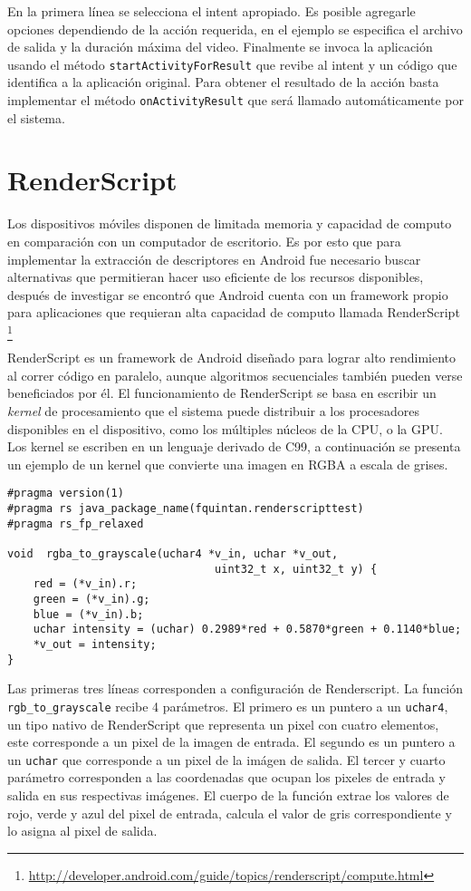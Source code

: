 En la primera línea se selecciona el intent apropiado. Es posible agregarle opciones dependiendo de la acción requerida, en el ejemplo se especifica el archivo de salida y la duración máxima del video. Finalmente se invoca la aplicación usando el método \texttt{startActivityForResult} que revibe al intent y un código que identifica a la aplicación original. Para obtener el resultado de la acción basta implementar el método \texttt{onActivityResult} que será llamado automáticamente por el sistema.  

\section{RenderScript}
Los dispositivos móviles disponen de limitada memoria y capacidad de computo en comparación con un computador de escritorio. Es por esto que para implementar la extracción de descriptores en Android fue necesario buscar alternativas que permitieran hacer uso eficiente de los recursos disponibles, después de investigar se encontró que Android cuenta con un framework propio para aplicaciones que requieran alta capacidad de computo llamada RenderScript \footnote{\url{http://developer.android.com/guide/topics/renderscript/compute.html}}

RenderScript es un framework de Android diseñado para lograr alto rendimiento al correr código en paralelo, aunque algoritmos secuenciales también pueden verse beneficiados por él. El funcionamiento de RenderScript se basa en escribir un \emph{kernel} de procesamiento que el sistema puede distribuir a los procesadores disponibles en el dispositivo, como los múltiples núcleos de la CPU, o la GPU. 
Los kernel se escriben en un lenguaje derivado de C99, a continuación se presenta un ejemplo de un kernel que convierte una imagen en RGBA a escala de grises.

\begin{lstlisting}[basicstyle=\small,frame=bt]
#pragma version(1)
#pragma rs java_package_name(fquintan.renderscripttest)
#pragma rs_fp_relaxed

void  rgba_to_grayscale(uchar4 *v_in, uchar *v_out,
                                uint32_t x, uint32_t y) {
    red = (*v_in).r;
    green = (*v_in).g;
    blue = (*v_in).b;
    uchar intensity = (uchar) 0.2989*red + 0.5870*green + 0.1140*blue;
    *v_out = intensity;
}
\end{lstlisting}

Las primeras tres líneas corresponden a configuración de Renderscript. La función \texttt{rgb\_to\_grayscale} recibe 4 parámetros. El primero es un puntero a un \texttt{uchar4}, un tipo nativo de RenderScript que representa un pixel con cuatro elementos, este corresponde a un pixel de la imagen de entrada. El segundo es un puntero a un \texttt{uchar} que corresponde a un pixel de la imágen de salida. El tercer y cuarto parámetro corresponden a las coordenadas que ocupan los pixeles de entrada y salida en sus respectivas imágenes. El cuerpo de la función extrae los valores de rojo, verde y azul del pixel de entrada, calcula el valor de gris correspondiente y lo asigna al pixel de salida.

